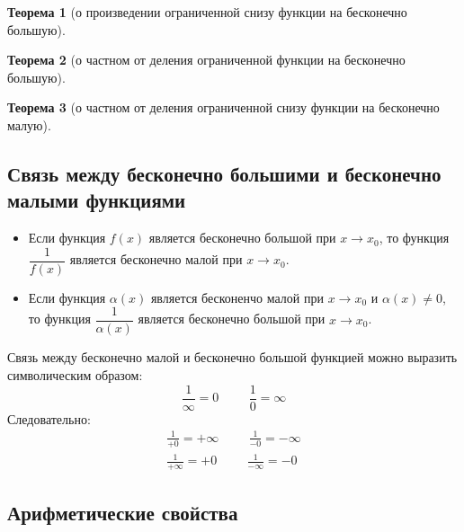 \documentclass[a4paper,12pt]{extbook}
\theoremstyle{numbered}
\theoremstyle{named}
\newtheorem*{theorem}{Теорема}
\theoremstyle{named}
\theoremstyle{named}
\begin{document}
\begin{theorem}[о произведении ограниченной снизу функции на бесконечно большую]
\end{theorem}

\begin{theorem}[о частном от деления ограниченной функции на бесконечно большую]
\end{theorem}

\begin{theorem}[о частном от деления ограниченной снизу функции на бесконечно малую]
\end{theorem}

\subsection*{Связь между бесконечно большими и бесконечно малыми функциями}
\label{sec:Связь между бесконечно большими и бесконечно малыми функциями}
\begin{itemize}
    \item {Если функция \(f(x)\) является бесконечно большой при \(x \to x_0\), то функция \(\dfrac{1}{f(x)}\) является бесконечно малой при \(x \to x_0\).}
    \item {Если функция \(\alpha(x)\)} является бесконенчо малой при \(x \to x_0\) и \(\alpha(x) \neq 0\), то функция \(\dfrac{1}{\alpha(x)}\) является бесконечно большой при \(x \to x_0\).
\end{itemize}

Связь между бесконечно малой и бесконечно большой функцией можно выразить символическим образом:
\[
    \frac{1}{\infty} = 0 \hspace{1cm} \frac{1}{0} = \infty
\]
Следовательно:
\begin{gather*}
    \frac{1}{+0} = +\infty \hspace{1cm} \frac{1}{-0} = -\infty \\
    \frac{1}{+ \infty} = +0 \hspace{1cm} \frac{1}{-\infty} = -0
\end{gather*}

\subsection*{Арифметические свойства}%
\label{sub:Арифметические свойства}
\end{document}
